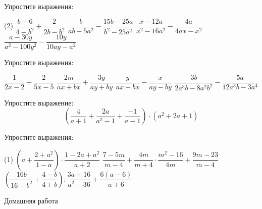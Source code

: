 \begin{class}[number=3]
	\begin{listofex}
		\item Упростите выражения:
		\begin{tasks}(2)
			\task \( \dfrac{b-6}{4-b^2}+\dfrac{2}{2b-b^2} \)
			\task \( \dfrac{b}{ab-5a^2}-\dfrac{15b-25a}{b^2-25a^2} \)
			\task \( \dfrac{x-12a}{x^2-16a^2}-\dfrac{4a}{4ax-x^2} \)
			\task \( \dfrac{a-30y}{a^2-100y^2}-\dfrac{10y}{10ay-a^2} \)
		\end{tasks}
		\item Упростите выражения:
		\begin{itasks}[2]
			\task \( \dfrac{1}{2x-2}+\dfrac{2}{5x-5} \)
			\task \( \dfrac{2m}{ax+bx}+\dfrac{3y}{ay+by} \)
			\task \( \dfrac{y}{ax-bx}-\dfrac{x}{ay-by} \)
			\task \( \dfrac{3b}{2a^3b-8a^2b^2}-\dfrac{5a}{12a^3b-3a^4} \)
		\end{itasks}
		\item Упростите выражение: \[ \left( \dfrac{4}{a+1}+\dfrac{2a}{a^2-1}+\dfrac{-1}{a-1} \right)\cdot(a^2+2a+1) \]
		\item Упростите выражения:
		\begin{tasks}(1)
			\task \( \left( a+\dfrac{2+a^2}{1-a} \right)\cdot\dfrac{1-2a+a^2}{a+2} \)
			\task \( \dfrac{7-5m}{m-4}+\dfrac{4m}{m+4}\cdot\dfrac{m^2-16}{4m}+\dfrac{9m-23}{m-4} \)
			\task \( \left( \dfrac{16b}{16-b^2}+\dfrac{4-b}{4+b} \right):\dfrac{3a+16}{a^2-36}+\dfrac{6(a-6)}{a+6} \)
		\end{tasks}
	\end{listofex}
\end{class}

\begin{homework}[number=3]
	\begin{listofex}
		\item Домашняя работа
	\end{listofex}
\end{homework}

